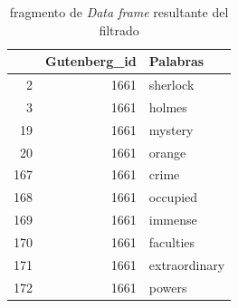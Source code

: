 \documentclass{article}
\begin{document}
\begin{table}
  \centering
  \caption{fragmento de \textit{Data frame} resultante del filtrado}
    \begin{tabular}{rrl}
    \toprule
          & \multicolumn{1}{l}{\textbf{Gutenberg\_id}} & \textbf{Palabras} \\
    \midrule
    2     & 1661  & sherlock \\
    3     & 1661  & holmes \\
    19    & 1661  & mystery \\
    20    & 1661  & orange \\
    167   & 1661  & crime \\
    168   & 1661  & occupied \\
    169   & 1661  & immense \\
    170   & 1661  & faculties \\
    171   & 1661  & extraordinary \\
    172   & 1661  & powers \\
    \bottomrule
    \end{tabular}%
  \label{tab:1}%
\end{table}%
\end{document}
